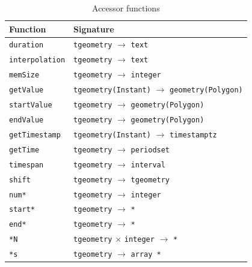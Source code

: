 \begin{table}[htb]
    \centering
    \begin{tabularx}{\textwidth}{|l|X|}
    \hline
    \textbf{Function}   & \textbf{Signature} \\ 
    \hline
    \lstinline+duration+            & \lstinline+tgeometry+ $\rightarrow$ \lstinline+text+\\
    \hline
    \lstinline+interpolation+       & \lstinline+tgeometry+ $\rightarrow$ \lstinline+text+\\
    \hline
    \lstinline+memSize+             & \lstinline+tgeometry+ $\rightarrow$ \lstinline+integer+ \\
    \hline
    \lstinline+getValue+            & \lstinline+tgeometry(Instant)+ $\rightarrow$ \lstinline+geometry(Polygon)+ \\
    \hline
    \lstinline+startValue+          & \lstinline+tgeometry+ $\rightarrow$ \lstinline+geometry(Polygon)+ \\
    \hline
    \lstinline+endValue+            & \lstinline+tgeometry+ $\rightarrow$ \lstinline+geometry(Polygon)+ \\
    \hline
    \lstinline+getTimestamp+        & \lstinline+tgeometry(Instant)+ $\rightarrow$ \lstinline+timestamptz+ \\
    \hline
    \lstinline+getTime+             & \lstinline+tgeometry+ $\rightarrow$ \lstinline+periodset+ \\
    \hline
    \lstinline+timespan+            & \lstinline+tgeometry+ $\rightarrow$ \lstinline+interval+ \\
    \hline
    \lstinline+shift+               & \lstinline+tgeometry+ $\rightarrow$ \lstinline+tgeometry+ \\
    \hline
    \lstinline+num*+                & \lstinline+tgeometry+ $\rightarrow$ \lstinline+integer+ \\
    \hline
    \lstinline+start*+              & \lstinline+tgeometry+ $\rightarrow$ \lstinline+*+ \\
    \hline
    \lstinline+end*+                & \lstinline+tgeometry+ $\rightarrow$ \lstinline+*+ \\
    \hline
    \lstinline+*N+                  & \lstinline+tgeometry+ $\times$ \lstinline+integer+ $\rightarrow$ \lstinline+*+ \\
    \hline
    \lstinline+*s+                  & \lstinline+tgeometry+ $\rightarrow$ \lstinline+array *+ \\
    \hline
    \end{tabularx}
    \caption{Accessor functions}
    \label{table:accessor_funcs}
\end{table}

